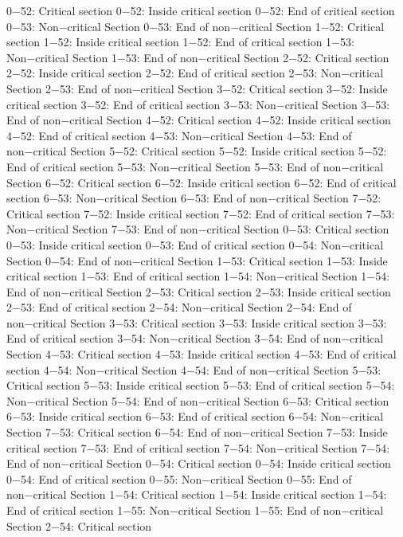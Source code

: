 0−52: Critical section
0−52: Inside critical section
0−52: End of critical section
0−53: Non−critical Section
0−53: End of non−critical Section
1−52: Critical section
1−52: Inside critical section
1−52: End of critical section
1−53: Non−critical Section
1−53: End of non−critical Section
2−52: Critical section
2−52: Inside critical section
2−52: End of critical section
2−53: Non−critical Section
2−53: End of non−critical Section
3−52: Critical section
3−52: Inside critical section
3−52: End of critical section
3−53: Non−critical Section
3−53: End of non−critical Section
4−52: Critical section
4−52: Inside critical section
4−52: End of critical section
4−53: Non−critical Section
4−53: End of non−critical Section
5−52: Critical section
5−52: Inside critical section
5−52: End of critical section
5−53: Non−critical Section
5−53: End of non−critical Section
6−52: Critical section
6−52: Inside critical section
6−52: End of critical section
6−53: Non−critical Section
6−53: End of non−critical Section
7−52: Critical section
7−52: Inside critical section
7−52: End of critical section
7−53: Non−critical Section
7−53: End of non−critical Section
0−53: Critical section
0−53: Inside critical section
0−53: End of critical section
0−54: Non−critical Section
0−54: End of non−critical Section
1−53: Critical section
1−53: Inside critical section
1−53: End of critical section
1−54: Non−critical Section
1−54: End of non−critical Section
2−53: Critical section
2−53: Inside critical section
2−53: End of critical section
2−54: Non−critical Section
2−54: End of non−critical Section
3−53: Critical section
3−53: Inside critical section
3−53: End of critical section
3−54: Non−critical Section
3−54: End of non−critical Section
4−53: Critical section
4−53: Inside critical section
4−53: End of critical section
4−54: Non−critical Section
4−54: End of non−critical Section
5−53: Critical section
5−53: Inside critical section
5−53: End of critical section
5−54: Non−critical Section
5−54: End of non−critical Section
6−53: Critical section
6−53: Inside critical section
6−53: End of critical section
6−54: Non−critical Section
7−53: Critical section
6−54: End of non−critical Section
7−53: Inside critical section
7−53: End of critical section
7−54: Non−critical Section
7−54: End of non−critical Section
0−54: Critical section
0−54: Inside critical section
0−54: End of critical section
0−55: Non−critical Section
0−55: End of non−critical Section
1−54: Critical section
1−54: Inside critical section
1−54: End of critical section
1−55: Non−critical Section
1−55: End of non−critical Section
2−54: Critical section

